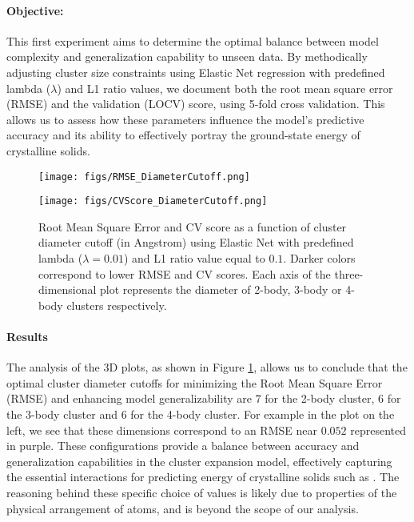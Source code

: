 \documentclass{article}
\let\citep\parencite   %
\begin{document}
\paragraph{Objective:}
This first experiment aims to determine the optimal balance between model complexity and generalization capability to unseen data. By methodically adjusting cluster size constraints using Elastic Net regression \citep{ElasticNet} with predefined lambda ($\lambda$) and L1 ratio values, we document both the root mean square error (RMSE) and the validation (LOCV) score, using 5-fold cross validation. This allows us to assess how these parameters influence the model's predictive accuracy and its ability to effectively portray the ground-state energy of crystalline solids.  
\begin{figure}[h!]
    \centering
    \begin{minipage}{0.45\textwidth}
        \centering
        \texttt{[image: figs/RMSE\_DiameterCutoff.png]}
    \end{minipage}\hfill
    \begin{minipage}{0.45\textwidth}
        \centering
         \texttt{[image: figs/CVScore\_DiameterCutoff.png]}
    \end{minipage}\hfill
    \caption{Root Mean Square Error and CV score as a function of cluster diameter cutoff (in Angstrom) using Elastic Net with predefined lambda ($\lambda=0.01$) and L1 ratio value equal to $0.1$. Darker colors correspond to lower RMSE and CV scores. Each axis of the three-dimensional plot represents the diameter of 2-body, 3-body or 4-body clusters respectively. }
    \label{fig:rmse_cutoff_5CV}
\end{figure}

\pagebreak
\paragraph{Results }
The analysis of the 3D plots, as shown in Figure \ref{fig:rmse_cutoff_5CV}, allows us to conclude that the optimal cluster diameter cutoffs for minimizing the Root Mean Square Error (RMSE) and enhancing model generalizability are $7$ for the 2-body cluster, $6 $ for the 3-body cluster and $6$ for the 4-body cluster. For example in the plot on the left, we see that these dimensions correspond to an RMSE near $0.052$ represented in purple. These configurations provide a balance between accuracy and generalization capabilities in the cluster expansion model, effectively capturing the essential interactions for predicting energy of crystalline solids such as . The reasoning behind these specific choice of values is likely due to properties of the physical arrangement of atoms, and is beyond the scope of our analysis.
\end{document}
